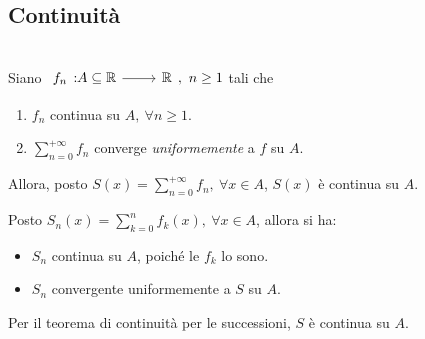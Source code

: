 \subsection{Continuità}
\begin{theorema}~{}\\
	Siano $\funz{f_n}{A\subseteq\realset}{\realset},\ n\geq 1$ tali che
	\begin{enumerate}
		\item $f_n$ continua su $A,\ \forall n\geq 1$.
		\item $\displaystyle\sum_{n=0}^{+\infty}f_n$ converge \textit{uniformemente} a $f$ su $A$.
	\end{enumerate}
	Allora, posto $\displaystyle S\left(x\right)=\sum_{n=0}^{+\infty}f_n,\ \forall x\in A$, $S\left(x\right)$ è continua su $A$.
\end{theorema}
\begin{demonstration}
	Posto $\displaystyle S_n\left(x\right)=\sum_{k=0}^{n}f_k\left(x\right),\ \forall x\in A$, allora si ha:
	\begin{itemize}
		\item $S_n$ continua su $A$, poiché le $f_k$ lo sono.
		\item $S_n$ convergente uniformemente a $S$ su $A$.
	\end{itemize}
	Per il teorema di continuità per le successioni, $S$ è continua su $A$.
\end{demonstration}
